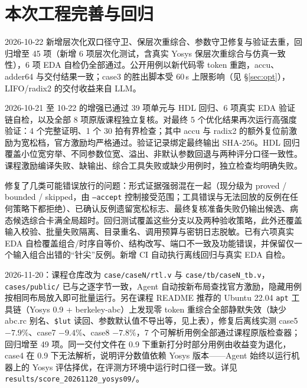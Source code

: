\documentclass[UTF8,a4paper,zihao=5]{ctexart}
\newcommand{\code}[1]{\texttt{#1}}
\begin{document}
\section{本次工程完善与回归}
2026-10-22 新增层次化双口径守卫、保层次重综合、参数守卫修复与验证去重，回归增至 45 项（新增 6 项层次化测试，含真实 Yosys 保层次重综合与仿真一致性），6 项 EDA 自检仍全部通过。公开用例以新代码零 token 重跑，accu、adder64 与交付结果一致；case3 的胜出脚本受 60\,s 上限影响（见 \S\ref{sec:opt}），LIFO/radix2 的交付收益来自 LLM。

2026-10-21 至 10-22 的增强已通过 39 项单元与 HDL 回归、6 项真实 EDA 验证链自检，以及全部 8 项原版课程独立复核。对最终 5 个优化结果再次运行高强度验证：4 个完整证明、1 个 30 拍有界检查；其中 accu 与 radix2 的额外复位前激励为宽松档，官方激励均严格通过。验证记录绑定最终输出 SHA-256。HDL 回归覆盖小位宽穷举、不同参数位宽、溢出、非默认参数回退与两种评分口径一致性。课程激励编译失败、缺输出、综合工具失败或缺少用例时，独立检查均明确失败。

修复了几类可能错误放行的问题：形式证据强弱混在一起（现分级为 proved / bounded / skipped，由 \code{--accept} 控制接受范围；工具错误与无法回放的反例在任何策略下都拒绝）、已确认反例遗留宽松标志、最终复核准备失败仍输出候选、病态候选综合卡满全局超时。回归测试覆盖这些分支以及两种验收策略，此外还覆盖输入校验、批量失败隔离、目录重名、调用预算与密钥日志脱敏。已有六项真实 EDA 自检覆盖组合/时序自等价、结构改写、端口不一致及功能错误，并保留仅一个输入组合出错的“针尖”反例。新增 CI 自动执行离线回归与真实 EDA 自检。

2026-11-20：课程仓库改为 \code{case/caseN/rtl.v} 与 \code{case/tb/caseN\_tb.v}，\code{cases/public/} 已与之逐字节一致，Agent 自动按新布局查找官方激励，隐藏用例按相同布局放入即可批量运行。另在课程 README 推荐的 Ubuntu 22.04 \code{apt} 工具链（Yosys 0.9 + berkeley-abc）上发现零 token 重综合全部静默失效（缺少 abc.rc 别名、\code{\$lut} 读回、参数默认值不导出等，见上表），修复后离线实测 case5 $-7.9\%$、case7 $-9.4\%$、case8 $-7.8\%$，7 个可解析用例全部通过课程原版检查器；回归增至 49 项。同一交付文件在 0.9 下重新打分时部分用例由收益变为退化，case4 在 0.9 下无法解析，说明评分数值依赖 Yosys 版本——Agent 始终以运行机器上的 Yosys 评估择优，在评测方环境中运行时口径一致。详见 \code{results/score\_20261120\_yosys09/}。
\end{document}
